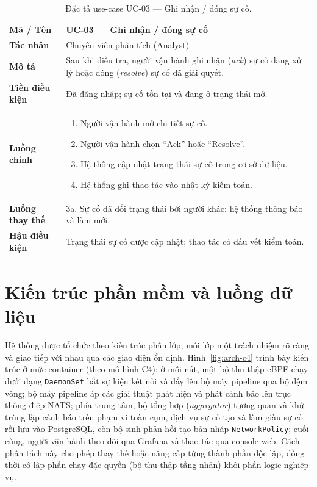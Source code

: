 \begin{table}[H]
  \centering
  \caption{Đặc tả use-case UC-03 --- Ghi nhận / đóng sự cố.}
  \label{tab:uc03}
  \small
  \begin{tabularx}{\linewidth}{@{}>{\bfseries}l X@{}}
    \toprule
    Mã / Tên & UC-03 --- Ghi nhận / đóng sự cố \\
    \midrule
    Tác nhân & Chuyên viên phân tích (Analyst) \\
    Mô tả & Sau khi điều tra, người vận hành ghi nhận (\textit{ack}) sự cố đang xử lý hoặc đóng (\textit{resolve}) sự cố đã giải quyết. \\
    Tiền điều kiện & Đã đăng nhập; sự cố tồn tại và đang ở trạng thái mở. \\
    Luồng chính &
      \begin{enumerate}[nosep,leftmargin=*]
        \item Người vận hành mở chi tiết sự cố.
        \item Người vận hành chọn ``Ack'' hoặc ``Resolve''.
        \item Hệ thống cập nhật trạng thái sự cố trong cơ sở dữ liệu.
        \item Hệ thống ghi thao tác vào nhật ký kiểm toán.
      \end{enumerate} \\
    Luồng thay thế & 3a. Sự cố đã đổi trạng thái bởi người khác: hệ thống thông báo và làm mới. \\
    Hậu điều kiện & Trạng thái sự cố được cập nhật; thao tác có dấu vết kiểm toán. \\
    \bottomrule
  \end{tabularx}
\end{table}

\section{Kiến trúc phần mềm và luồng dữ liệu}
\label{ch:architecture}

Hệ thống được tổ chức theo kiến trúc phân lớp, mỗi lớp một trách nhiệm rõ ràng và
giao tiếp với nhau qua các giao diện ổn định. Hình~\ref{fig:arch-c4} trình bày kiến
trúc ở mức container (theo mô hình C4): ở mỗi nút, một bộ thu thập eBPF chạy dưới dạng
\texttt{DaemonSet} bắt sự kiện kết nối và đẩy lên bộ máy pipeline qua bộ đệm vòng; bộ
máy pipeline áp các giải thuật phát hiện và phát cảnh báo lên trục thông điệp NATS;
phía trung tâm, bộ tổng hợp (\textit{aggregator}) tương quan và khử trùng lặp cảnh báo
trên phạm vi toàn cụm, dịch vụ sự cố tạo và làm giàu sự cố rồi lưu vào PostgreSQL, còn
bộ sinh phản hồi tạo bản nháp
\texttt{NetworkPolicy}; cuối cùng, người vận hành theo dõi qua Grafana và thao tác qua
console web. Cách phân tách này cho phép thay thế hoặc nâng cấp từng thành phần độc
lập, đồng thời cô lập phần chạy đặc quyền (bộ thu thập tầng nhân) khỏi phần logic
nghiệp vụ.

